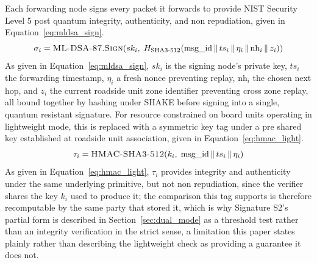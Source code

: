 \documentclass[final,5p,twocolumn]{elsarticle}
\theoremstyle{remark}
\theoremstyle{plain}
\begin{document}
Each forwarding node signs every packet it forwards to provide NIST Security
Level 5 post quantum integrity, authenticity, and non repudiation, given in
Equation~\eqref{eq:mldsa_sign}.
\begin{equation}
	\sigma_i = \textsc{ML-DSA-87.Sign}\!\left(sk_i,\; H_{\text{SHA3-512}}\!\left(\text{msg\_id} \,\|\, ts_i \,\|\, \eta_i \,\|\, \text{nh}_i \,\|\, z_i\right)\right)
	\label{eq:mldsa_sign}
\end{equation}
As given in Equation~\eqref{eq:mldsa_sign}, $sk_i$ is the signing node's
private key, $ts_i$ the forwarding timestamp, $\eta_i$ a fresh nonce
preventing replay, $\text{nh}_i$ the chosen next hop, and $z_i$ the current
roadside unit zone identifier preventing cross zone replay, all bound
together by hashing under SHAKE before signing into a single, quantum
resistant signature. For resource constrained on board units operating in
lightweight mode, this is replaced with a symmetric key tag under a pre
shared key established at roadside unit association, given in
Equation~\eqref{eq:hmac_light}.
\begin{equation}
	\tau_i = \textsc{HMAC-SHA3-512}\!\left(k_i,\; \text{msg\_id} \,\|\, ts_i \,\|\, \eta_i\right)
	\label{eq:hmac_light}
\end{equation}
As given in Equation~\eqref{eq:hmac_light}, $\tau_i$ provides integrity and
authenticity under the same underlying primitive, but not non repudiation,
since the verifier shares the key $k_i$ used to produce it; the comparison
this tag supports is therefore recomputable by the same party that stored
it, which is why Signature S2's partial form is described in
Section~\ref{sec:dual_mode} as a threshold test rather than an integrity
verification in the strict sense, a limitation this paper states plainly
rather than describing the lightweight check as providing a guarantee it
does not.
\end{document}
